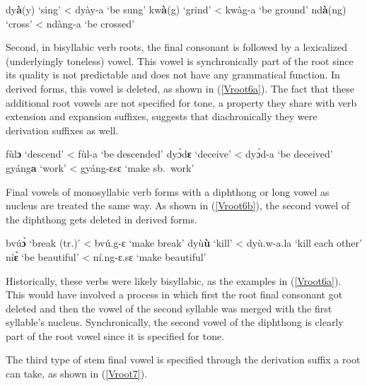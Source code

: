 \begin{exe}
\ex\label{Vroot5}
\begin{xlist}
\ex dy{\bfseries à}(y) `sing' < dyày-a `be sung'
\ex kw{\bfseries à}(g) `grind' < kwàg-a `be ground'
\ex nd{\bfseries à}(ng) `cross' < ndàng-a `be crossed'
\end{xlist}
\end{exe}

Second, in bisyllabic verb roots, the final consonant is followed by a lexicalized (underlyingly toneless) vowel. This vowel is synchronically part of the root since its quality is not predictable and does not have any grammatical function. In derived forms, this vowel is deleted, as shown in (\ref{Vroot6a}). The fact that these additional root vowels are not specified for tone, a property they share with verb extension and expansion suffixes, suggests that diachronically they were derivation suffixes as well.

\begin{exe}
\ex\label{Vroot6a}
\begin{xlist}
\ex fùl{\bfseries ɔ} `descend' < fùl-a `be descended'
\ex dyɔ̀d{\bfseries ɛ} `deceive' < dyɔ̀d-a `be deceived'
\ex gyáng{\bfseries a} `work' < gyáng-ɛsɛ `make sb.\ work'
\end{xlist}
\end{exe}

\noindent Final vowels of monosyllabic verb forms with a diphthong or long vowel as nucleus are treated the same way. As shown in (\ref{Vroot6b}), the second vowel of the diphthong gets deleted in derived forms.

\begin{exe}
\ex\label{Vroot6b}
\begin{xlist}
\ex bvú{\bfseries ɔ̀} `break (tr.)' < bvú.g-ɛ `make break'
\ex dyù{\bfseries ù} `kill' < dyù.w-a.la `kill each other'
\ex ní{\bfseries ɛ̀} `be beautiful' < ní.ng-ɛ.sɛ `make beautiful'
\end{xlist}
\end{exe}

\noindent Historically, these verbs were likely bisyllabic, as the examples in (\ref{Vroot6a}). This would have involved a process in which first the root final consonant got deleted and then the vowel of the second syllable was merged with the first syllable's nucleus. Synchronically, the second vowel of the diphthong is clearly part of the root vowel since it is specified for tone.

The third type of stem final vowel is specified through the derivation suffix a root can take, as shown in (\ref{Vroot7}). 


